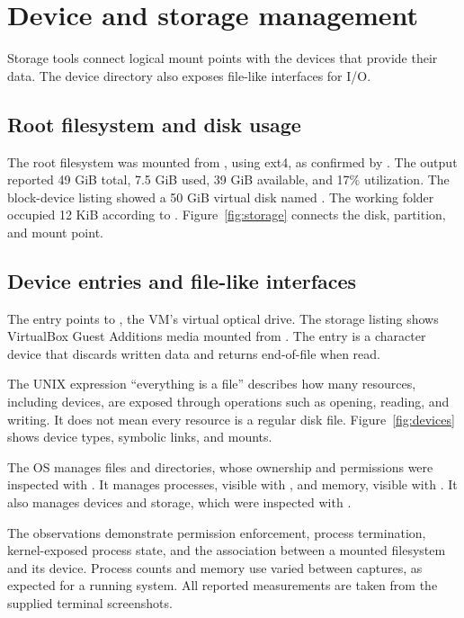 \documentclass{../latex/utmreport}
\begin{document}
\chapter{Device and storage management}
Storage tools connect logical mount points with the devices that provide
their data. The device directory also exposes file-like interfaces for I/O.

\section{Root filesystem and disk usage}
The root filesystem \code{/} was mounted from , using
ext4, as confirmed by . The  output reported
49 GiB total, 7.5 GiB used, 39 GiB available, and 17\% utilization.
The block-device listing showed a 50 GiB virtual disk named .
The working folder occupied 12 KiB according to .
Figure~\ref{fig:storage} connects the disk, partition, and mount point.

\section{Device entries and file-like interfaces}
The entry  points to , the VM's virtual optical
drive. The storage listing shows VirtualBox Guest Additions media mounted
from . The entry  is a character device that
discards written data and returns end-of-file when read.

The UNIX expression ``everything is a file'' describes how many resources,
including devices, are exposed through operations such as opening, reading,
and writing. It does not mean every resource is a regular disk file.
Figure~\ref{fig:devices} shows device types, symbolic links, and mounts.

\utmconclusions
The OS manages files and directories, whose ownership and permissions were
inspected with . It manages processes, visible with ,
and memory, visible with . It also manages devices and storage,
which were inspected with .

The observations demonstrate permission enforcement, process termination,
kernel-exposed process state, and the association between a mounted
filesystem and its device. Process counts and memory use varied between
captures, as expected for a running system. All reported measurements are
taken from the supplied terminal screenshots.
\end{document}
